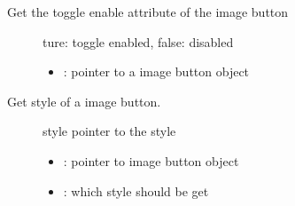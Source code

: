 \documentclass[letterpaper,10pt,english]{sphinxmanual}
\begin{document}

\begin{fulllineitems}
\label{\detokenize{object-types/imgbtn:_CPPv420lv_imgbtn_get_togglePK8lv_obj_t}}%
\pysigstartmultiline
{}\label{\detokenize{object-types/imgbtn:lv__imgbtn_8h_1a8bf57b132423718d9a63d871564192f7}}%
\pysigstopmultiline
Get the toggle enable attribute of the image button \begin{description}
\item[{}] \leavevmode
ture: toggle enabled, false: disabled 

\item[{}] \leavevmode\begin{itemize}
\item {} 
: pointer to a image button object 

\end{itemize}

\end{description}


\end{fulllineitems}


\begin{fulllineitems}
\label{\detokenize{object-types/imgbtn:_CPPv419lv_imgbtn_get_stylePK8lv_obj_t17lv_imgbtn_style_t}}%
\pysigstartmultiline
{}\label{\detokenize{object-types/imgbtn:lv__imgbtn_8h_1a1988694e97297f5eb57a7b4855503dff}}%
\pysigstopmultiline
Get style of a image button. \begin{description}
\item[{}] \leavevmode
style pointer to the style 

\item[{}] \leavevmode\begin{itemize}
\item {} 
: pointer to image button object 

\item {} 
: which style should be get 

\end{itemize}

\end{description}


\end{fulllineitems}
\end{document}
